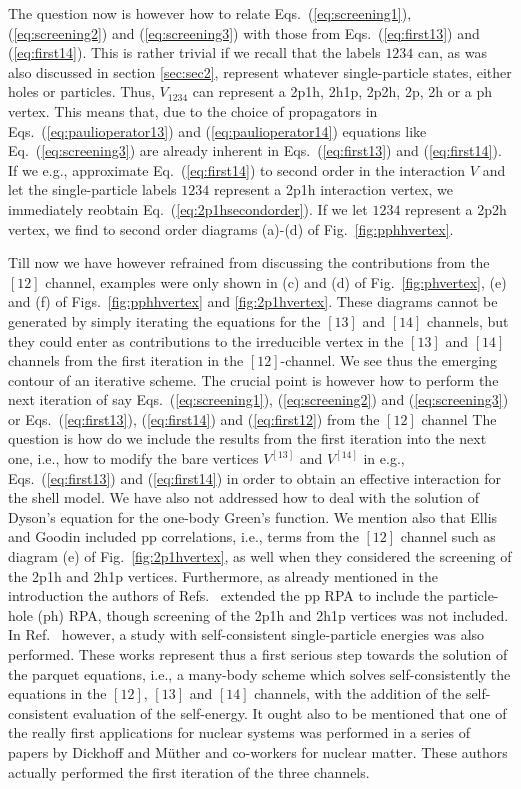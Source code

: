\documentclass[twoside,12pt]{article}
\begin{document}
The question now is however how to relate
Eqs.\ (\ref{eq:screening1}),
(\ref{eq:screening2}) and (\ref{eq:screening3}) with those
from Eqs.\ (\ref{eq:first13}) and
(\ref{eq:first14}).
This is rather trivial if we recall that the labels
$1234$ can, as was also discussed in section \ref{sec:sec2},
represent whatever single-particle states, either holes
or particles. Thus, $V_{1234}$ can represent
a 2p1h, 2h1p, 2p2h, 2p, 2h or a ph vertex.
This means that, due to the choice of propagators
in Eqs.\ (\ref{eq:paulioperator13}) and
(\ref{eq:paulioperator14}) equations like Eq.\
(\ref{eq:screening3}) are already inherent in Eqs.\
(\ref{eq:first13}) and
(\ref{eq:first14}). If we e.g., approximate Eq.\ (\ref{eq:first14})
to second order in the interaction $V$ and let the
single-particle labels $1234$ represent a 2p1h interaction
vertex, we immediately reobtain Eq.\
(\ref{eq:2p1hsecondorder}). If we let $1234$ represent
a 2p2h vertex, we find to second order diagrams
(a)-(d) of Fig.\ \ref{fig:pphhvertex}.


Till now we have however refrained from discussing the contributions
from the $[12]$ channel, examples were only shown in (c) and (d) of
Fig.\ \ref{fig:phvertex}, (e) and (f) of Figs.\ \ref{fig:pphhvertex}
and \ref{fig:2p1hvertex}.
These diagrams cannot be generated by simply iterating
the equations for the $[13]$ and $[14]$ channels, but they could enter
as contributions to the irreducible vertex
in the $[13]$ and $[14]$ channels from the first iteration
in the $[12]$-channel.
We see thus the emerging contour of an iterative scheme.
The crucial point is however how to perform the next iteration of say
Eqs.\ (\ref{eq:screening1}),
(\ref{eq:screening2}) and (\ref{eq:screening3}) or
Eqs.\ (\ref{eq:first13}),
(\ref{eq:first14})  and (\ref{eq:first12}) from the
$[12]$ channel
The question is how do we include the results
from the first iteration into the next one, i.e.,
how to modify the bare vertices $V^{[13]}$ and $V^{[14]}$
in e.g., Eqs.\ (\ref{eq:first13}) and
(\ref{eq:first14}) in order to obtain
an effective interaction for the shell model.
We have also not addressed how to deal
with the solution of Dyson's equation for the one-body
Green's function.
We mention also that Ellis and Goodin \cite{eg80}
included pp correlations, i.e., terms from the $[12]$ channel
such as diagram (e) of Fig.\ \ref{fig:2p1hvertex},
as well when they considered the screening of the 2p1h and 2h1p vertices.
Furthermore, as already mentioned in the introduction
the authors of Refs.\ \cite{emm91,hmm95}
extended the pp RPA to include the particle-hole (ph) RPA, though
screening of the 2p1h and 2h1p vertices was not included. In Ref.\
\cite{hmm95} however, a study with
self-consistent  single-particle energies was also performed.
These works represent thus a first serious step towards the solution
of the parquet equations, i.e., a many-body scheme which solves
self-consistently the equations in the $[12]$, $[13]$ and $[14]$
channels, with the addition of the self-consistent evaluation
of the self-energy. It ought also to be mentioned
that one of the really
first applications for nuclear systems was performed
in a series of papers by Dickhoff and M\"uther and co-workers
\cite{nuclearmatter}  for nuclear matter. These authors
actually performed the first iteration of the three
channels.
\end{document}
